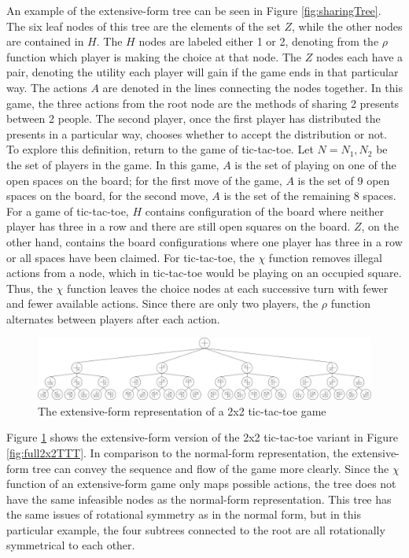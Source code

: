 An example of the extensive-form tree can be seen in Figure \ref{fig:sharingTree}. The six leaf nodes of this tree are the elements of the set $Z$, while the other nodes are contained in $H$. The $H$ nodes are labeled either 1 or 2, denoting from the $\rho$ function which player is making the choice at that node. The $Z$ nodes each have a pair, denoting the utility each player will gain if the game ends in that particular way. The actions $A$ are denoted in the lines connecting the nodes together. In this game, the three actions from the root node are the methods of sharing 2 presents between 2 people. The second player, once the first player has distributed the presents in a particular way, chooses whether to accept the distribution or not.\\

To explore this definition, return to the game of tic-tac-toe. Let $N={N_1, N_2}$ be the set of players in the game. In this game, $A$ is the set of playing on one of the open spaces on the board; for the first move of the game, $A$ is the set of 9 open spaces on the board, for the second move, $A$ is the set of the remaining 8 spaces. For a game of tic-tac-toe, $H$ contains configuration of the board where neither player has three in a row and there are still open squares on the board. $Z$, on the other hand, contains the board configurations where one player has three in a row or all spaces have been claimed. For tic-tac-toe, the $\chi$ function removes illegal actions from a node, which in tic-tac-toe would be playing on an occupied square. Thus, the $\chi$ function leaves the choice nodes at each successive turn with fewer and fewer available actions. Since there are only two players, the $\rho$ function alternates between players after each action.

\begin{figure}[H]
  \centering
  \includegraphics[width=16cm]{figures/TTTExtTree.png}
  \caption{The extensive-form representation of a 2x2 tic-tac-toe game}
  \label{fig:2x2TTTExtForm}
\end{figure}

Figure \ref{fig:2x2TTTExtForm} shows the extensive-form version of the 2x2 tic-tac-toe variant in Figure \ref{fig:full2x2TTT}. In comparison to the normal-form representation, the extensive-form tree can convey the sequence and flow of the game more clearly. Since the $\chi$ function of an extensive-form game only maps possible actions, the tree does not have the same infeasible nodes as the normal-form representation. This tree has the same issues of rotational symmetry as in the normal form, but in this particular example, the four subtrees connected to the root are all rotationally symmetrical to each other.

